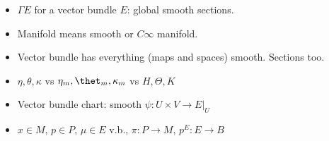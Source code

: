 \begin{itemize}
    \item $\Gamma E$ for a vector bundle $E$: global smooth sections.
    
    \item Manifold means smooth or $C\infty$ manifold.
    
    \item Vector bundle has everything (maps and spaces) smooth. Sections too.
    
    \item $\eta, \theta, \kappa$ vs $\eta_m, \thet_m, \kappa_m$ vs $H, \Theta, K$
    
    \item Vector bundle chart: smooth $\psi:U \times V \to E|_U$
    
    \item $x \in M$, $p \in P$, $\mu \in E$ v.b., $\pi: P \to M$, $p^E: E \to B$
\end{itemize}